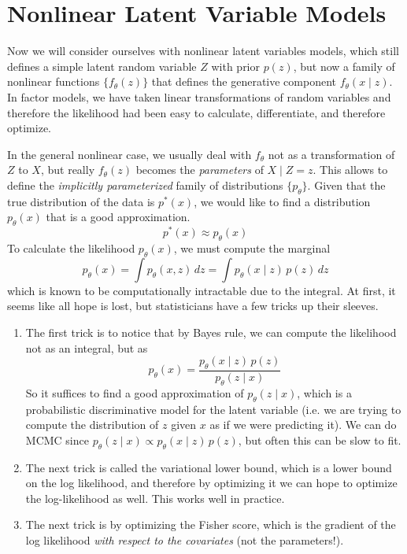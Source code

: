 \section{Nonlinear Latent Variable Models}

  Now we will consider ourselves with nonlinear latent variables models, which still defines a simple latent random variable $Z$ with prior $p(z)$, but now a family of nonlinear functions $\{f_\theta (z)\}$ that defines the generative component $f_\theta (x \mid z)$. In factor models, we have taken linear transformations of random variables and therefore the likelihood had been easy to calculate, differentiate, and therefore optimize. 

  In the general nonlinear case, we usually deal with $f_\theta$ not as a transformation of $Z$ to $X$, but really $f_\theta (z)$ becomes the \textit{parameters} of $X \mid Z = z$. This allows to define the \textit{implicitly parameterized} family of distributions $\{p_\theta\}$. Given that the true distribution of the data is $p^\ast (x)$, we would like to find a distribution $p_\theta (x)$ that is a good approximation. 
  \begin{equation}
    p^\ast (x) \approx p_\theta (x)
  \end{equation}
  To calculate the likelihood $p_\theta (x)$, we must compute the marginal 
  \begin{equation}
    p_\theta (x) = \int p_\theta (x, z) \,dz = \int p_\theta (x \mid z) \, p(z) \,dz
  \end{equation}
  which is known to be computationally intractable due to the integral. At first, it seems like all hope is lost, but statisticians have a few tricks up their sleeves. 
  \begin{enumerate} 
    \item The first trick is to notice that by Bayes rule, we can compute the likelihood not as an integral, but as 
    \begin{equation}
      p_\theta (x) = \frac{p_\theta (x \mid z) \, p(z)}{p_\theta (z \mid x)} 
    \end{equation}
    So it suffices to find a good approximation of $p_\theta (z \mid x)$, which is a probabilistic discriminative model for the latent variable (i.e. we are trying to compute the distribution of $z$ given $x$ as if we were predicting it). We can do MCMC since $p_\theta (z \mid x) \propto p_\theta (x \mid z) \, p(z)$, but often this can be slow to fit. 

    \item The next trick is called the variational lower bound, which is a lower bound on the log likelihood, and therefore by optimizing it we can hope to optimize the log-likelihood as well. This works well in practice. 

    \item The next trick is by optimizing the Fisher score, which is the gradient of the log likelihood \textit{with respect to the covariates} (not the parameters!). 
  \end{enumerate}


